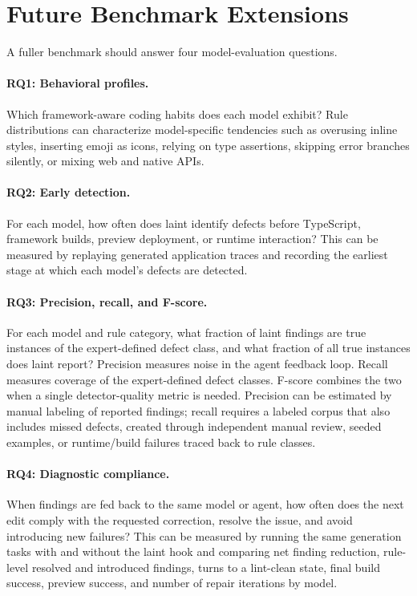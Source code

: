 \documentclass[11pt]{article}
\begin{document}
\FloatBarrier

\section{Future Benchmark Extensions}

A fuller benchmark should answer four model-evaluation questions.

\paragraph{RQ1: Behavioral profiles.}
Which framework-aware coding habits does each model exhibit? Rule distributions can characterize model-specific tendencies such as overusing inline styles, inserting emoji as icons, relying on type assertions, skipping error branches silently, or mixing web and native APIs.

\paragraph{RQ2: Early detection.}
For each model, how often does laint identify defects before TypeScript, framework builds, preview deployment, or runtime interaction? This can be measured by replaying generated application traces and recording the earliest stage at which each model's defects are detected.

\paragraph{RQ3: Precision, recall, and F-score.}
For each model and rule category, what fraction of laint findings are true instances of the expert-defined defect class, and what fraction of all true instances does laint report? Precision measures noise in the agent feedback loop. Recall measures coverage of the expert-defined defect classes. F-score combines the two when a single detector-quality metric is needed. Precision can be estimated by manual labeling of reported findings; recall requires a labeled corpus that also includes missed defects, created through independent manual review, seeded examples, or runtime/build failures traced back to rule classes.

\paragraph{RQ4: Diagnostic compliance.}
When findings are fed back to the same model or agent, how often does the next edit comply with the requested correction, resolve the issue, and avoid introducing new failures? This can be measured by running the same generation tasks with and without the laint hook and comparing net finding reduction, rule-level resolved and introduced findings, turns to a lint-clean state, final build success, preview success, and number of repair iterations by model.
\end{document}
